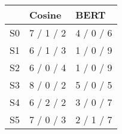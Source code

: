 \begin{tabular}{lll}
\toprule
 & Cosine & BERT \\
\midrule
S0 & 7 / 1 / 2 & 4 / 0 / 6 \\
S1 & 6 / 1 / 3 & 1 / 0 / 9 \\
S2 & 6 / 0 / 4 & 1 / 0 / 9 \\
S3 & 8 / 0 / 2 & 5 / 0 / 5 \\
S4 & 6 / 2 / 2 & 3 / 0 / 7 \\
S5 & 7 / 0 / 3 & 2 / 1 / 7 \\
\bottomrule
\end{tabular}
